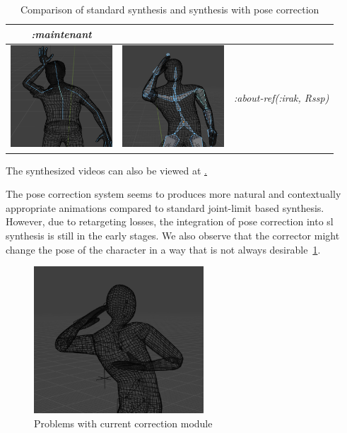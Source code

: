 \documentclass[../../main.tex]{subfiles}
\begin{document}
\begin{table}
\begin{tabular}{|c|c|c|}
      \emph{:maintenant} \\
    \hline
    \includegraphics[width = 1.5in]{chapters/pose_correction/images/standard_synthesis_abt_ref_irak.png} & \includegraphics[width = 1.5in]{chapters/pose_correction/images/pose_correction_synthesis_abt_ref_irak.png} &
      \emph{:about-ref(:irak, Rssp)} \\
    \hline
  \end{tabular}
  \caption{Comparison of standard synthesis and synthesis with pose correction}
  \label{tab:results}
\end{table}

The synthesized videos can also be viewed at \href{todo}.

The pose correction system seems to produces more natural and contextually appropriate animations compared to standard joint-limit based synthesis. However, due to retargeting losses, the integration of pose correction into \gls{sl} synthesis is still in the early stages. We also observe that the corrector might change the pose of the character in a way that is not always desirable~\ref{fig:problem_pose_correction}.

\begin{figure}
  \centering \includegraphics[width = 2.5in]{chapters/intermediate_blocks_pose_correction/images/problem_pose_correction.png}
  \caption{Problems with current correction module}
  \label{fig:problem_pose_correction}
\end{figure}
\end{document}
